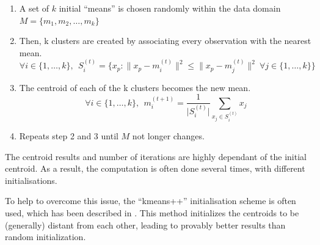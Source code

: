 \begin{enumerate}
    \item A set of $k$ initial \enquote{means} is chosen randomly within the data domain $M = \{m_1, m_2, \ldots, m_k \}$
    
    \item Then, k clusters are created by associating every observation with the nearest mean.
    $$ \forall i \in \{ 1, \ldots, k \}, ~~ S_{i}^{(t)}= \big \{ x_{p}:{\big \|}x_{p}-m_{i}^{(t)}{\big \|}^{2}\leq {\big \|}x_{p}-m_{j}^{(t)}{\big \|}^{2} ~ \forall j \in \{ 1, \ldots, k \} \big \}$$
    
    \item The centroid of each of the k clusters becomes the new mean.
    $$ \forall i \in \{ 1, \ldots, k \}, ~~ m_{i}^{(t+1)}=\frac {1}{\lvert S_{i}^{(t)} \rvert } \sum _{x_{j} \in S_{i}^{(t)}} x_{j} $$
    
    \item Repeats step 2 and 3 until $M$ not longer changes.
\end{enumerate}

The centroid results and number of iterations are highly dependant of the initial centroid. As a result, the computation is often done several times, with different initialisations.

To help to overcome this issue, the \enquote{kmeans++} initialisation scheme is often used, which has been described in \cite{Arthur2007}. This method initializes the centroids to be (generally) distant from each other, leading to provably better results than random initialization.
